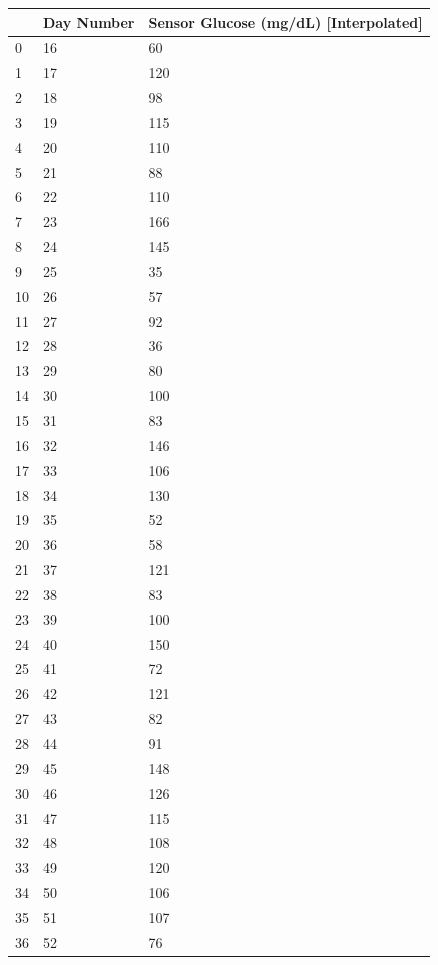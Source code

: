 \bigskip\noindent
\begin{tabular}{p{}p{}p{}}
\toprule
 & Day Number & Sensor Glucose (mg/dL) [Interpolated] \\
\hline
0 & 16 & 60 \\
\hline
1 & 17 & 120 \\
\hline
2 & 18 & 98 \\
\hline
3 & 19 & 115 \\
\hline
4 & 20 & 110 \\
\hline
5 & 21 & 88 \\
\hline
6 & 22 & 110 \\
\hline
7 & 23 & 166 \\
\hline
8 & 24 & 145 \\
\hline
9 & 25 & 35 \\
\hline
10 & 26 & 57 \\
\hline
11 & 27 & 92 \\
\hline
12 & 28 & 36 \\
\hline
13 & 29 & 80 \\
\hline
14 & 30 & 100 \\
\hline
15 & 31 & 83 \\
\hline
16 & 32 & 146 \\
\hline
17 & 33 & 106 \\
\hline
18 & 34 & 130 \\
\hline
19 & 35 & 52 \\
\hline
20 & 36 & 58 \\
\hline
21 & 37 & 121 \\
\hline
22 & 38 & 83 \\
\hline
23 & 39 & 100 \\
\hline
24 & 40 & 150 \\
\hline
25 & 41 & 72 \\
\hline
26 & 42 & 121 \\
\hline
27 & 43 & 82 \\
\hline
28 & 44 & 91 \\
\hline
29 & 45 & 148 \\
\hline
30 & 46 & 126 \\
\hline
31 & 47 & 115 \\
\hline
32 & 48 & 108 \\
\hline
33 & 49 & 120 \\
\hline
34 & 50 & 106 \\
\hline
35 & 51 & 107 \\
\hline
36 & 52 & 76 \\

\end{tabular}
